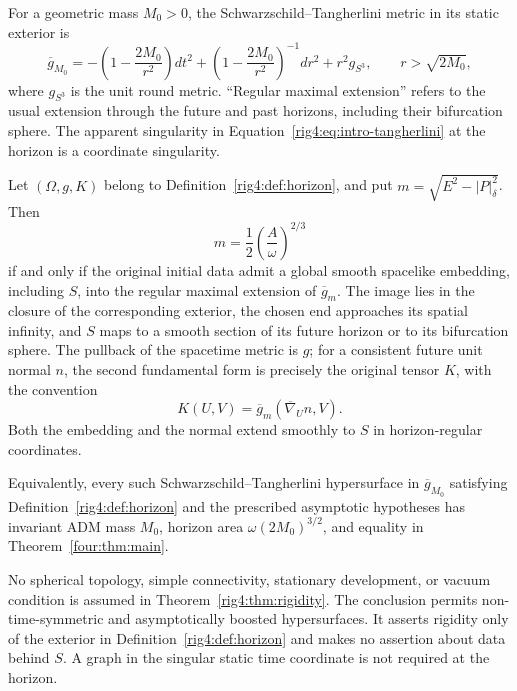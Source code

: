 For a geometric mass \(M_0>0\), the Schwarzschild--Tangherlini metric
\cite{Tangherlini1963} in its static exterior is
\begin{equation}\label{rig4:eq:intro-tangherlini}
 \overline g_{M_0}
 =-\left(1-\frac{2M_0}{r^2}\right)dt^2
  +\left(1-\frac{2M_0}{r^2}\right)^{-1}dr^2+r^2g_{S^3},
 \qquad r>\sqrt{2M_0},
\end{equation}
where \(g_{S^3}\) is the unit round metric. ``Regular maximal extension''
refers to the usual extension through the future and past horizons,
including their bifurcation sphere. The apparent singularity in
Equation~\eqref{rig4:eq:intro-tangherlini} at the horizon is a coordinate singularity.

\begin{theorem}\label{rig4:thm:rigidity}
Let \((\Omega,g,K)\) belong to Definition~\ref{rig4:def:horizon}, and put
\(m=\sqrt{E^2-|P|_\delta^2}\). Then
\begin{equation}\label{rig4:eq:intro-equality}
 m=\frac12\left(\frac A\omega\right)^{2/3}
\end{equation}
if and only if the original initial data admit a global smooth spacelike
embedding, including \(S\), into the regular maximal extension of
\(\overline g_m\). The image lies in the closure of the corresponding exterior,
the chosen end approaches its spatial infinity, and \(S\) maps to a smooth
section of its future horizon or to its bifurcation sphere. The pullback of
the spacetime metric is \(g\); for a consistent future unit normal \(n\),
the second fundamental form is precisely the original tensor \(K\), with
the convention
\begin{equation}\label{rig4:eq:intro-second-fundamental-form}
 K(U,V)=\overline g_m(\overline\nabla_U n,V).
\end{equation}
Both the embedding and the normal extend smoothly to \(S\) in horizon-regular
coordinates.

Equivalently, every such Schwarzschild--Tangherlini hypersurface in
$\overline g_{M_0}$ satisfying
Definition~\ref{rig4:def:horizon} and the prescribed asymptotic hypotheses has
invariant ADM mass \(M_0\), horizon area
\(\omega(2M_0)^{3/2}\), and equality in
Theorem~\ref{four:thm:main}.
\end{theorem}

No spherical topology, simple connectivity, stationary development, or
vacuum condition is assumed in Theorem~\ref{rig4:thm:rigidity}. The conclusion
permits non-time-symmetric and asymptotically boosted hypersurfaces. It
asserts rigidity only of the exterior in Definition~\ref{rig4:def:horizon} and
makes no assertion about data behind \(S\). A graph in the singular static
time coordinate is not required at the horizon.

